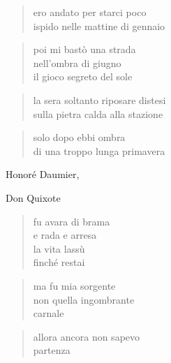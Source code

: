 	\begin{verse}
		ero andato per starci poco\\
		ispido nelle mattine di gennaio
	\end{verse}

	\begin{verse}
		poi mi bastò una strada\\
		nell'ombra di giugno\\
		il gioco segreto del sole
	\end{verse}

	\begin{verse}
		la sera soltanto riposare distesi\\
		sulla pietra calda alla stazione
	\end{verse}

	\begin{verse}
		solo dopo ebbi ombra\\
		di una troppo lunga primavera
	\end{verse}

\clearpage


\begin{artItem}
	Honoré Daumier, \begin{otherlanguage}{spanish}%
		Don Quixote%
	\end{otherlanguage}
\end{artItem}

	\begin{verse}
		fu avara di brama\\
		e rada e arresa\\
		la vita lassù\\
		finché restai
	\end{verse}

	\begin{verse}
		ma fu mia sorgente\\
		non quella ingombrante\\
		carnale
	\end{verse}

	\begin{verse}
		allora ancora non sapevo\\
		partenza
	\end{verse}
